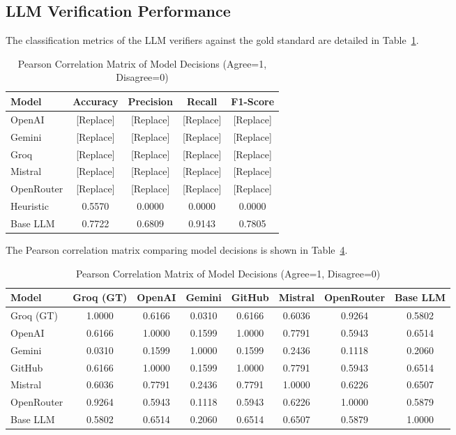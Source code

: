 \documentclass[journal,compsoc]{IEEEtran}
\begin{document}
\begin{itemize}
\begin{table}[t]
\subsection{LLM Verification Performance}
The classification metrics of the LLM verifiers against the gold standard are detailed in Table~\ref{tab:eval_metrics}.

\begin{table}[h]
\centering
\caption{LLM Verification Performance Comparison}
\label{tab:eval_metrics}
\begin{tabular}{lcccc}
\toprule
\textbf{Model} & \textbf{Accuracy} & \textbf{Precision} & \textbf{Recall} & \textbf{F1-Score} \\
\midrule
OpenAI & [Replace] & [Replace] & [Replace] & [Replace] \\
Gemini & [Replace] & [Replace] & [Replace] & [Replace] \\
Groq & [Replace] & [Replace] & [Replace] & [Replace] \\
Mistral & [Replace] & [Replace] & [Replace] & [Replace] \\
OpenRouter & [Replace] & [Replace] & [Replace] & [Replace] \\
Heuristic & 0.5570 & 0.0000 & 0.0000 & 0.0000 \\
Base LLM & 0.7722 & 0.6809 & 0.9143 & 0.7805 \\
\bottomrule
\end{tabular}
\end{table}

The Pearson correlation matrix comparing model decisions is shown in Table~\ref{tab:pearson}.

\begin{table}[t]
\centering
\caption{Pearson Correlation Matrix of Model Decisions (Agree=1, Disagree=0)}
\label{tab:pearson}
\begin{tabular}{lccccccc}
\toprule
\textbf{Model} & \textbf{Groq (GT)} & \textbf{OpenAI} & \textbf{Gemini} & \textbf{GitHub} & \textbf{Mistral} & \textbf{OpenRouter} & \textbf{Base LLM} \\
\midrule
Groq (GT) & 1.0000 & 0.6166 & 0.0310 & 0.6166 & 0.6036 & 0.9264 & 0.5802 \\
OpenAI & 0.6166 & 1.0000 & 0.1599 & 1.0000 & 0.7791 & 0.5943 & 0.6514 \\
Gemini & 0.0310 & 0.1599 & 1.0000 & 0.1599 & 0.2436 & 0.1118 & 0.2060 \\
GitHub & 0.6166 & 1.0000 & 0.1599 & 1.0000 & 0.7791 & 0.5943 & 0.6514 \\
Mistral & 0.6036 & 0.7791 & 0.2436 & 0.7791 & 1.0000 & 0.6226 & 0.6507 \\
OpenRouter & 0.9264 & 0.5943 & 0.1118 & 0.5943 & 0.6226 & 1.0000 & 0.5879 \\
Base LLM & 0.5802 & 0.6514 & 0.2060 & 0.6514 & 0.6507 & 0.5879 & 1.0000 \\
\bottomrule
\end{tabular}
\end{table}


\end{table}
\end{itemize}
\end{document}
